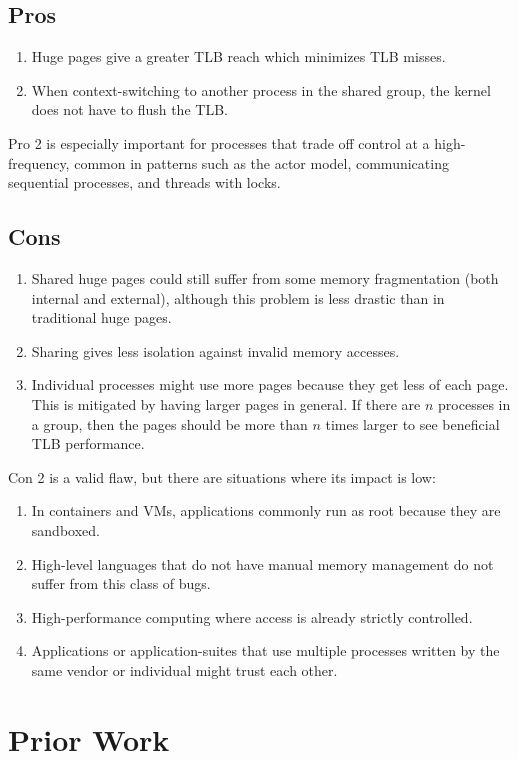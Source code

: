 \documentclass[sigconf,screen,nonacm,natbib]{acmart}
\begin{document}
\subsection{Pros}
\begin{enumerate}
\item Huge pages give a greater TLB reach which minimizes TLB misses.
\item When context-switching to another process in the shared group, the kernel does not have to flush the TLB.
\end{enumerate}

Pro 2 is especially important for processes that trade off control at a high-frequency, common in patterns such as the actor model, communicating sequential processes, and threads with locks.

\subsection{Cons}
\begin{enumerate}
\item Shared huge pages could still suffer from some memory fragmentation (both internal and external), although this problem is less drastic than in traditional huge pages.
\item Sharing gives less isolation against invalid memory accesses.
\item Individual processes might use more pages because they get less of each page.
  This is mitigated by having larger pages in general.
  If there are \(n\) processes in a group, then the pages should be more than \(n\) times larger to see beneficial TLB performance.
\end{enumerate}

Con 2 is a valid flaw, but there are situations where its impact is low:
\begin{enumerate}
\item In containers and VMs, applications commonly run as root because they are sandboxed.
\item High-level languages that do not have manual memory management do not suffer from this class of bugs.
\item High-performance computing where access is already strictly controlled.
\item Applications or application-suites that use multiple processes written by the same vendor or individual might trust each other.
\end{enumerate}

\section{Prior Work}
\end{document}
